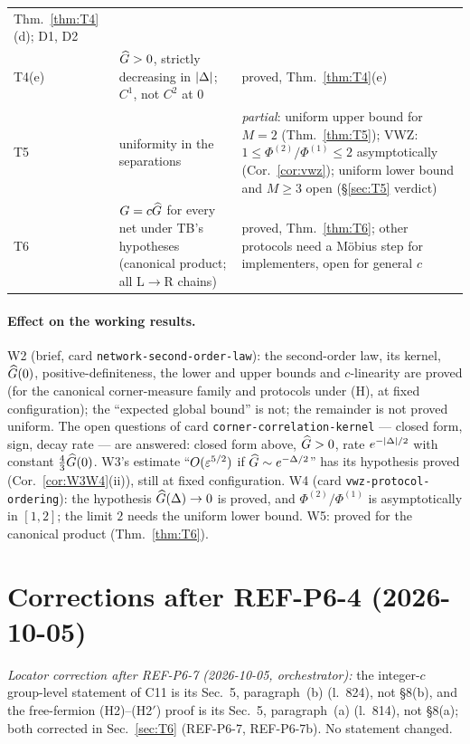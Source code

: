 \documentclass[11pt]{article}
\theoremstyle{definition}\newtheorem{hypothesis}[theorem]{Hypothesis}
\begin{document}
\begin{center}
\begin{tabular}{p{}p{}p{}}
 Thm.~\ref{thm:T4}(d); D1, D2\\
T4(e) & $\widehat G>0$, strictly decreasing in $\lvert\Delta\rvert$; $C^1$, not $C^2$ at $0$ & proved, Thm.~\ref{thm:T4}(e)\\
T5 & uniformity in the separations & \emph{partial}: uniform upper bound for $M=2$ (Thm.~\ref{thm:T5});
 VWZ: $1\le\Phi^{(2)}/\Phi^{(1)}\le2$ asymptotically (Cor.~\ref{cor:vwz}); uniform lower bound and $M\ge3$
 open (\S\ref{sec:T5} verdict)\\
T6 & $G=c\widehat G$ for every net under TB's hypotheses (canonical product; all L$\to$R chains) & proved,
 Thm.~\ref{thm:T6}; other protocols need a M\"obius step for implementers, open for general $c$\\\bottomrule
\end{tabular}
\end{center}

\paragraph{Effect on the working results.}
W2 (brief, card \texttt{network-second-order-law}): the second-order law, its kernel, $\widehat G(0)$,
positive-definiteness, the lower and upper bounds and $c$-linearity are proved (for the canonical corner-measure
family and protocols under (H), at fixed configuration); the ``expected global bound'' is not; the remainder is
not proved uniform.  The open questions of card \texttt{corner-correlation-kernel} --- closed form, sign,
decay rate --- are answered: closed form above, $\widehat G>0$, rate $e^{-\lvert\Delta\rvert/2}$ with constant
$\frac43\widehat G(0)$.  W3's estimate ``$O(\varepsilon^{5/2})$ if $\widehat G\sim e^{-\Delta/2}$'' has its hypothesis proved
(Cor.~\ref{cor:W3W4}(ii)), still at fixed configuration.  W4 (card \texttt{vwz-protocol-ordering}): the
hypothesis $\widehat G(\Delta)\to0$ is proved, and $\Phi^{(2)}/\Phi^{(1)}$ is asymptotically in $[1,2]$; the limit $2$
needs the uniform lower bound.  W5: proved for the canonical product (Thm.~\ref{thm:T6}).

\section{Corrections after REF-P6-4 (2026-10-05)}\label{sec:corrREF}
\noindent\emph{Locator correction after REF-P6-7 (2026-10-05, orchestrator):} the integer-$c$ group-level statement of C11 is its Sec.~5, paragraph~(b) (l.~824), not \S8(b), and the free-fermion (H2)--(H2$'$) proof is its Sec.~5, paragraph~(a) (l.~814), not \S8(a); both corrected in Sec.~\ref{sec:T6} (REF-P6-7, REF-P6-7b). No statement changed.
\end{document}
